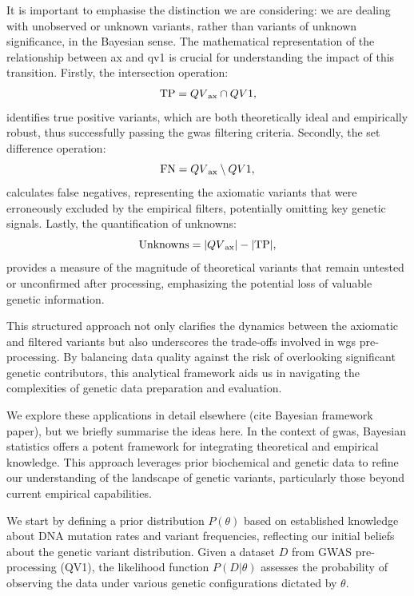 It is important to emphasise the distinction we are considering: we are dealing with unobserved or unknown variants, rather than variants of unknown significance, in the Bayesian sense.
The mathematical representation of the relationship between \ac{ax} and \ac{qv}1 is crucial for understanding the impact of this transition. Firstly, the intersection operation:
$$
\text{TP} = QV\textsubscript{ax} \cap QV1,
$$
identifies true positive variants, which are both theoretically ideal and empirically robust, thus successfully passing the \ac{gwas} filtering criteria.
 Secondly, the set difference operation:
$$
\text{FN} = QV\textsubscript{ax} \setminus QV1,
$$
calculates false negatives, representing the axiomatic variants that were erroneously excluded by the empirical filters, potentially omitting key genetic signals. 
Lastly, the quantification of unknowns:
$$
\text{Unknowns} = |QV\textsubscript{ax}| - |\text{TP}|,
$$
provides a measure of the magnitude of theoretical variants that remain untested or unconfirmed after processing, emphasizing the potential loss of valuable genetic information.

This structured approach not only clarifies the dynamics between the axiomatic and filtered variants but also underscores the trade-offs involved in \ac{wgs} pre-processing. 
By balancing data quality against the risk of overlooking significant genetic contributors, this analytical framework aids us in navigating the complexities of genetic data preparation and evaluation.

We explore these applications in detail elsewhere (cite Bayesian framework paper), but we briefly summarise the ideas here. 
In the context of \ac{gwas}, Bayesian statistics offers a potent framework for integrating theoretical and empirical knowledge. 
This approach leverages prior biochemical and genetic data to refine our understanding of the landscape of genetic variants, particularly those beyond current empirical capabilities.

We start by defining a prior distribution \( P(\theta) \) based on established knowledge about DNA mutation rates and variant frequencies, reflecting our initial beliefs about the genetic variant distribution. Given a dataset \( D \) from GWAS pre-processing (QV1), the likelihood function \( P(D|\theta) \) assesses the probability of observing the data under various genetic configurations dictated by \( \theta \).

